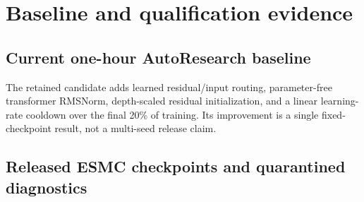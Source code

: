 \documentclass{article}
\begin{document}
\section{Baseline and qualification evidence}
\label{sec:evidence}

\subsection{Current one-hour AutoResearch baseline}

\begin{table}[H]
  \centering
  \scriptsize
  \setlength{\tabcolsep}{3.4pt}
  \caption{Compute-matched Stage-1 runs on four L40S GPUs. P@L is the keep or
  reject metric; losses are required diagnostics.}
  \label{tab:autoresearch}
\end{table}

The retained candidate adds learned residual/input routing, parameter-free
transformer RMSNorm, depth-scaled residual initialization, and a linear
learning-rate cooldown over the final 20\% of training. Its improvement is a
single fixed-checkpoint result, not a multi-seed release claim.

\subsection{Released ESMC checkpoints and quarantined diagnostics}
\end{document}
